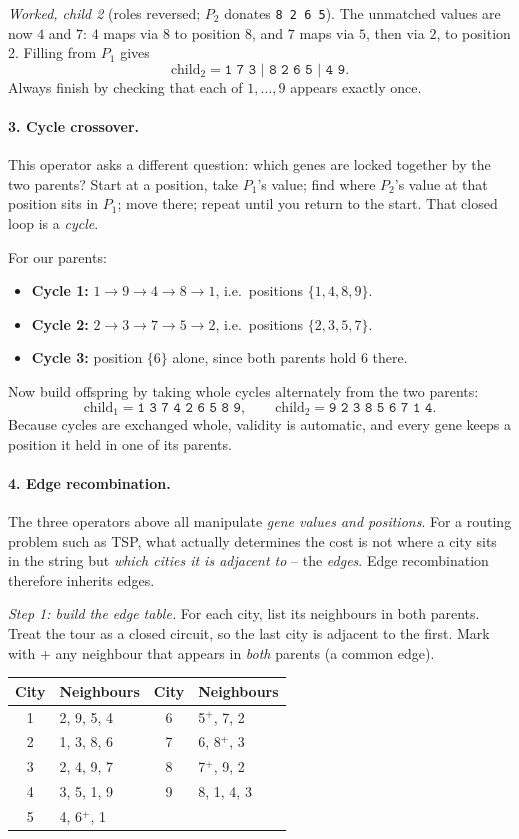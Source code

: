 \documentclass[11pt,a4paper]{article}
\begin{document}
\emph{Worked, child 2} (roles reversed; $P_2$ donates \texttt{8\ 2\ 6\ 5}).
The unmatched values are now $4$ and $7$: $4$ maps via $8$ to position 8, and
$7$ maps via $5$, then via $2$, to position 2. Filling from $P_1$ gives
\[
  \text{child}_2=\texttt{1\ 7\ 3\ | 8\ 2\ 6\ 5 |\ 4\ 9}.
\]
Always finish by checking that each of $1,\ldots,9$ appears exactly once.

\paragraph{3. Cycle crossover.}
This operator asks a different question: which genes are locked together by
the two parents? Start at a position, take $P_1$'s value; find where $P_2$'s
value at that position sits in $P_1$; move there; repeat until you return to
the start. That closed loop is a \emph{cycle}.

For our parents:
\begin{itemize}
\item \textbf{Cycle 1:} $1\to9\to4\to8\to1$, i.e.\ positions $\{1,4,8,9\}$.
\item \textbf{Cycle 2:} $2\to3\to7\to5\to2$, i.e.\ positions $\{2,3,5,7\}$.
\item \textbf{Cycle 3:} position $\{6\}$ alone, since both parents hold $6$
      there.
\end{itemize}
Now build offspring by taking whole cycles alternately from the two parents:
\[
  \text{child}_1=\texttt{1\ 3\ 7\ 4\ 2\ 6\ 5\ 8\ 9},\qquad
  \text{child}_2=\texttt{9\ 2\ 3\ 8\ 5\ 6\ 7\ 1\ 4}.
\]
Because cycles are exchanged whole, validity is automatic, and every gene
keeps a position it held in one of its parents.

\paragraph{4. Edge recombination.}
The three operators above all manipulate \emph{gene values and positions}.
For a routing problem such as TSP, what actually determines the cost is not
where a city sits in the string but \emph{which cities it is adjacent to} --
the \emph{edges}. Edge recombination therefore inherits edges.

\emph{Step 1: build the edge table.} For each city, list its neighbours in
both parents. Treat the tour as a closed circuit, so the last city is
adjacent to the first. Mark with $+$ any neighbour that appears in
\emph{both} parents (a common edge).
\begin{center}
\begin{tabular}{@{}cl@{\qquad}cl@{}}
\toprule
City & Neighbours & City & Neighbours\\
\midrule
1 & 2, 9, 5, 4      & 6 & 5$^+$, 7, 2\\
2 & 1, 3, 8, 6      & 7 & 6, 8$^+$, 3\\
3 & 2, 4, 9, 7      & 8 & 7$^+$, 9, 2\\
4 & 3, 5, 1, 9      & 9 & 8, 1, 4, 3\\
5 & 4, 6$^+$, 1     &   & \\
\bottomrule
\end{tabular}
\end{center}
\end{document}
